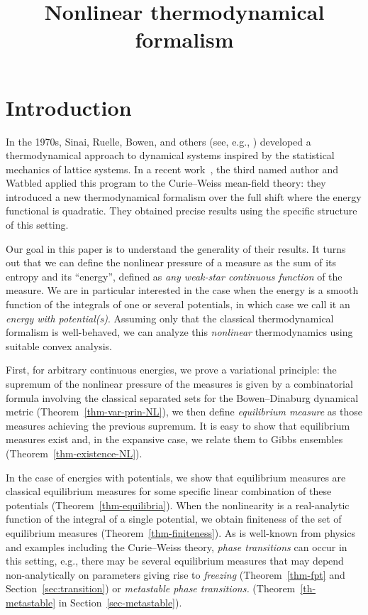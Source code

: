 \documentclass[AHL, Unicode, longabstracts,published]{cedram}
\title{Nonlinear thermodynamical formalism}
\author[\initial{J.} \lastname{Buzzi}]{\firstname{Jérôme} \lastname{Buzzi}}
\author[\initial{B.} \lastname{Kloeckner}]{\firstname{Benoît} \lastname{Kloeckner}}
\author[\initial{R.} \lastname{Leplaideur}]{\firstname{Renaud} \lastname{Leplaideur}}
\theoremstyle{plain}
\theoremstyle{plain}
\newcounter{In}
\newcommand*\8{\infty}
\begin{document}
\maketitle



\section{Introduction}

In the 1970s, Sinai, Ruelle, Bowen, and others (see, e.g., \cite{Bowen-book,Ruelle-book,Sinai-GibbsMeasures}) developed a thermodynamical approach to dynamical systems inspired by the statistical mechanics of lattice systems. In a recent work~\cite{Leplaideur-Watbled}, the third named author and Watbled applied this program to the Curie--Weiss mean-field theory: they introduced a new thermodynamical formalism over the full shift where the energy functional is quadratic. They obtained precise results using the specific structure of this setting.

Our goal in this paper is to understand the generality of their results. It turns out that we can define the nonlinear pressure of a measure as the sum of its entropy and its ``energy'', defined as \emph{any weak-star continuous function} of the measure. We are in particular interested in the case when the energy is a smooth function of the integrals of one or several potentials, in which case we call it an \emph{energy with potential(s)}. Assuming only that the classical thermodynamical formalism is well-behaved, we can analyze this \emph{nonlinear} thermodynamics using suitable convex analysis.

First, for arbitrary continuous energies, we prove a variational principle: the supremum of the nonlinear pressure of the measures is given by a combinatorial formula involving the classical separated sets for the Bowen--Dinaburg dynamical metric (Theorem~\ref{thm-var-prin-NL}), we then define \emph{equilibrium measure} as those measures achieving the previous supremum. It is easy to show that equilibrium measures exist and, in the expansive case, we relate them to Gibbs ensembles (Theorem~\ref{thm-existence-NL}).

In the case of energies with potentials, we show that equilibrium measures are classical equilibrium measures for some specific linear combination of these potentials (Theorem~\ref{thm-equilibria}). When the nonlinearity is a real-analytic function of the integral of a single potential, we obtain finiteness of the set of equilibrium measures (Theorem~\ref{thm-finiteness}). As is well-known from physics and examples including the Curie--Weiss theory, \emph{phase transitions} can occur in this setting, e.g., there may be several equilibrium measures that may depend non-analytically on parameters giving rise to \emph{freezing} (Theorem~\ref{thm-fpt} and Section~\ref{sec:transition}) or \emph{metastable phase transitions.} (Theorem~\ref{th-metastable} in Section~\ref{sec-metastable}).
\end{document}

